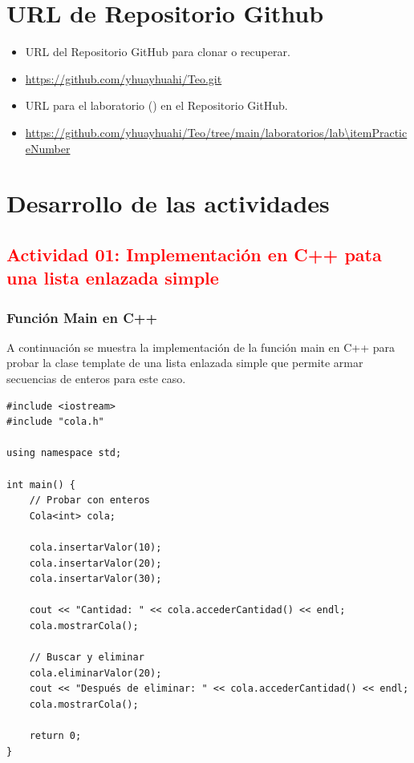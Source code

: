 \section{URL de Repositorio Github}

\begin{itemize}
    \item URL del Repositorio GitHub para clonar o recuperar.
    \item \url{https://github.com/yhuayhuahi/Teo.git}
    \item URL para el laboratorio (\itemPracticeNumber) en el Repositorio GitHub.
    \item \url{https://github.com/yhuayhuahi/Teo/tree/main/laboratorios/lab\itemPracticeNumber}
\end{itemize}




\section{Desarrollo de las actividades}

\subsection {\textcolor{red}{Actividad 01: Implementación en C++ pata una lista enlazada simple}}

\subsubsection {Función Main en C++}

A continuación se muestra la implementación de la función main en C++ para probar la clase template de una lista enlazada simple que permite armar secuencias de enteros para este caso.

\begin{lstlisting}[style=cpp-style, caption={Función Main en cpp}]
#include <iostream>
#include "cola.h"

using namespace std;

int main() {
    // Probar con enteros
    Cola<int> cola;
    
    cola.insertarValor(10);
    cola.insertarValor(20);
    cola.insertarValor(30);
    
    cout << "Cantidad: " << cola.accederCantidad() << endl;
    cola.mostrarCola();
    
    // Buscar y eliminar
    cola.eliminarValor(20);
    cout << "Después de eliminar: " << cola.accederCantidad() << endl;
    cola.mostrarCola();
    
    return 0;
}
\end{lstlisting}

